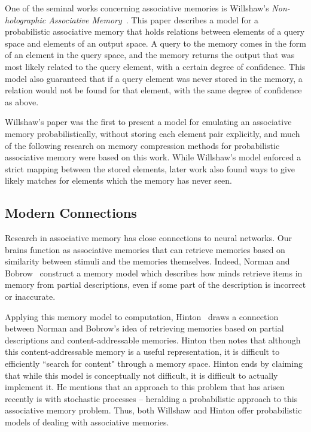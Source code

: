 \documentclass{sig-alternate}
\begin{document}
One of the seminal works concerning associative memories is Willshaw's \textit{Non-holographic
Associative Memory}~\cite{holographic}. This paper describes a model for a probabilistic associative memory
that holds relations between elements of a query space and elements of an output space. A query
to the memory comes in the form of an element in the query space, and the memory returns the
output that was most likely related to the query element, with a certain degree of confidence.
This model also guaranteed that if a query element was never stored in the memory, a relation
would not be found for that element, with the same degree of confidence as above.

Willshaw's paper was the first to present a model for emulating an associative memory
probabilistically, without storing each element pair explicitly,
and much of the following research on memory compression methods
for probabilistic associative memory were based on this work. While Willshaw's model
enforced a strict mapping between the stored elements, later work also found ways to
give likely matches for elements which the memory has never seen.

\subsection{Modern Connections}
\label{subsec:modern}

Research in associative memory has close connections to neural networks. Our brains function as 
associative memories that can retrieve memories based on similarity between stimuli and the memories themselves. 
Indeed, Norman and Bobrow~\cite{bobrow} construct a memory model which describes how minds retrieve 
items in memory from partial descriptions, even if some part of the description is incorrect or inaccurate. 

Applying this memory model to computation, Hinton~\cite{hinton} draws a connection between Norman and Bobrow's idea of 
retrieving memories based on partial descriptions and content-addressable memories.
Hinton then notes that although this content-addressable memory is a useful representation,  
it is difficult to efficiently ``search for content" through a memory space. 
Hinton ends by claiming that while this model is conceptually not difficult, it is difficult to actually 
implement it. He mentions that an approach to this problem that has arisen recently is with stochastic processes 
-- heralding a probabilistic approach to this associative memory problem. Thus, both Willshaw and Hinton offer probabilistic models
of dealing with associative memories.
\end{document}

